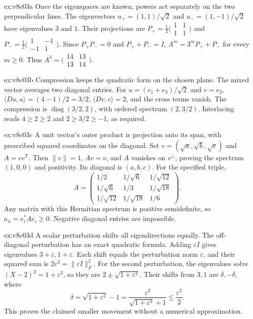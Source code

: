 \begin{solution}{ex:v8c03a}
\idea Once the eigenspaces are known, powers act separately on the two perpendicular lines.
\writeup The eigenvectors $u_+=(1,1)/\sqrt2$ and $u_-=(1,-1)/\sqrt2$ have eigenvalues $3$ and $1$. Their projections are $P_+=\frac12\bigl(\begin{smallmatrix}1&1\\1&1\end{smallmatrix}\bigr)$ and $P_-=\frac12\bigl(\begin{smallmatrix}1&-1\\-1&1\end{smallmatrix}\bigr)$. Since $P_+P_-=0$ and $P_++P_-=I$, $A^m=3^mP_++P_-$ for every $m\ge0$. Thus $A^3=\bigl(\begin{smallmatrix}14&13\\13&14\end{smallmatrix}\bigr)$.
\end{solution}
\begin{solution}{ex:v8c03b}
\idea Compression keeps the quadratic form on the chosen plane. The mixed vector averages two diagonal entries.
\writeup For $u=(e_1+e_3)/\sqrt2$ and $v=e_2$, $\langle Du,u\rangle=(4-1)/2=3/2$, $\langle Dv,v\rangle=2$, and the cross terms vanish. The compression is $\operatorname{diag}(3/2,2)$, with ordered spectrum $(2,3/2)$. Interlacing reads $4\ge2\ge2$ and $2\ge3/2\ge-1$, as required.
\end{solution}
\begin{solution}{ex:v8c03c}
\idea A unit vector's outer product is projection onto its span, with prescribed squared coordinates on the diagonal.
\writeup Set $v=(\sqrt a,\sqrt b,\sqrt c)$ and $A=vv^{\mathsf T}$. Then $\|v\|=1$, $Av=v$, and $A$ vanishes on $v^\perp$, proving the spectrum $(1,0,0)$ and positivity. Its diagonal is $(a,b,c)$. For the specified triple,
\[A=\begin{pmatrix}1/2&1/\sqrt6&1/\sqrt{12}\\1/\sqrt6&1/3&1/\sqrt{18}\\1/\sqrt{12}&1/\sqrt{18}&1/6\end{pmatrix}.\]
Any matrix with this Hermitian spectrum is positive semidefinite, so $a_{ii}=e_i^*Ae_i\ge0$. Negative diagonal entries are impossible.
\end{solution}
\begin{solution}{ex:v8c03d}
\idea A scalar perturbation shifts all eigendirections equally. The off-diagonal perturbation has an exact quadratic formula.
\writeup Adding $\varepsilon I$ gives eigenvalues $3+\varepsilon,1+\varepsilon$. Each shift equals the perturbation norm $\varepsilon$, and their squared sum is $2\varepsilon^2=\|\varepsilon I\|_F^2$. For the second perturbation, the eigenvalues solve $(X-2)^2=1+\varepsilon^2$, so they are $2\pm\sqrt{1+\varepsilon^2}$. Their shifts from $3,1$ are $\delta,-\delta$, where
\[\delta=\sqrt{1+\varepsilon^2}-1=\frac{\varepsilon^2}{\sqrt{1+\varepsilon^2}+1}\le\frac{\varepsilon^2}{2}.\]
This proves the claimed smaller movement without a numerical approximation.
\end{solution}

